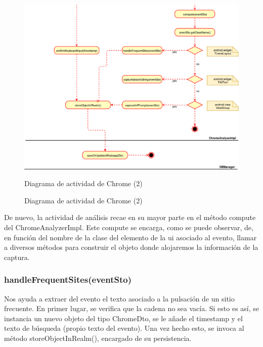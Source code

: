 \documentclass[12pt,a4paper,oneside]{book} %
\begin{document}
\begin{landscape}
\begin{figure}[htb]
	\begin{center}
     	\includegraphics[scale=0.4]{pictures/activity/chromeActivityDiagram2.png}
	    	\caption{Diagrama de actividad de Chrome (2)}{Diagrama de actividad de Chrome (2)}
    	\label{fig:Diagrama de actividad Chrome (2)}
	\end{center}
\end{figure}
\end{landscape}
De nuevo, la actividad de análisis recae en su mayor parte en el método compute del ChromeAnalyzerImpl. Este compute se encarga, como se puede observar, de, en función del nombre de la clase del elemento de la ui asociado al evento, llamar a diversos métodos para construir el objeto donde alojaremos la información de la captura. 
\subsubsection{handleFrequentSites(eventSto)}
Nos ayuda a extraer del evento el texto asociado a la pulsación de un sitio frecuente. En primer lugar, se verifica que la cadena no sea vacía. Si esto es así, se instancia un nuevo objeto del tipo ChromeDto, se le añade el timestamp y el texto de búsqueda (propio texto del evento). 
\newline \newline 
Una vez hecho esto, se invoca al método storeObjectInRealm(), encargado de su persistencia. 
\end{document}
